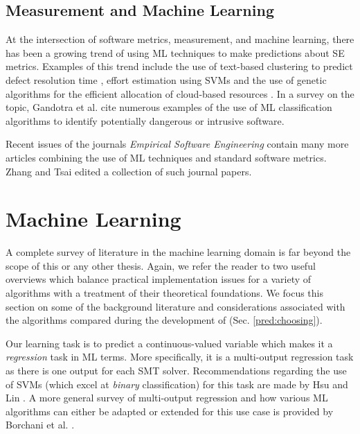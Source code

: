 \subsection{Measurement and Machine Learning}
\label{sub:lrmmml}

At the intersection of software metrics, measurement, and machine learning, there has been a growing trend of using ML techniques to make predictions about SE metrics. Examples of this trend include the use of text-based clustering to predict defect resolution time \cite{Assar2016}, effort estimation using SVMs \cite{Song:2014:PBR:2639490.2639510} and the use of genetic algorithms for the efficient allocation of cloud-based resources \cite{cloudML}. In a survey on the topic, Gandotra et al. \cite{ClassificationSurvey} cite numerous examples of the use of ML classification algorithms to identify potentially dangerous or intrusive software. 

Recent issues of the journals \textit{Empirical Software Engineering} contain many more articles combining the use of ML techniques and standard software metrics. Zhang and Tsai \cite{ML4SE} edited a collection of such journal papers.  

\section{Machine Learning}
\label{sec:lrml}

A complete survey of literature in the machine learning domain is far beyond the scope of this or any other thesis. Again, we refer the reader to two useful overviews \cite{Bishop, Mitchell} which balance practical implementation issues for a variety of algorithms with a treatment of their theoretical foundations. We focus this section on some of the background literature and considerations associated with the algorithms compared during the development of \where (Sec. \ref{pred:choosing}).

Our learning task is to predict a continuous-valued variable which makes it a \textit{regression} task in ML terms. More specifically, it is a multi-output regression task as there is one output for each SMT solver. Recommendations regarding the use of SVMs (which excel at \textit{binary} classification) for this task are made by Hsu and Lin \cite{MulticlassSVM}. A more general survey of multi-output regression and how various ML algorithms can either be adapted or extended for this use case is provided by Borchani et al. \cite{multisurvey}. 

